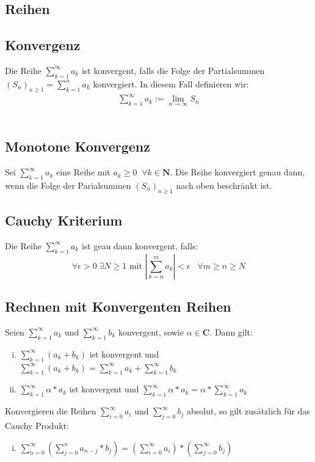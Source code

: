 \documentclass[8pt]{extarticle}
\begin{document}
\begin{multicols*}{3}
\newpage
\section{Reihen}
\hypertarget{sec:1}{}
  \subsection{Konvergenz}
Die Reihe $\sum_{k = 1}^{\infty} a_k$ ist konvergent, falls die Folge der
Partialsummen $(S_n)_{n \geq 1} = \sum_{k = 1}^{n} a_k$
konvergiert. In diesem Fall definieren wir:
\begin{align*}
  \sum_{k = 1}^{\infty} a_k := \lim_{n \rightarrow \infty} S_n
\end{align*}\\
  \subsection {Monotone Konvergenz}
Sei $\sum_{k = 1}^\infty a_k$ eine Reihe mit $a_k \geq 0 \;\; \forall k \in \mathbf{N}$.
Die Reihe konvergiert genau dann, wenn die Folge der Parialsummen $(S_n)_{n \geq 1}$ nach
oben beschränkt ist.
\subsection{Cauchy Kriterium}
Die Reihe $\sum_{k = 1}^{\infty} a_k$ ist geau dann konvergent, falls:
$$
  \forall \epsilon > 0 \; \exists N \geq 1 \text{ mit } \left| \sum_{k = n}^m a_k \right| < \epsilon \; \; \; \forall m \geq n \geq N
$$
\subsection{Rechnen mit Konvergenten Reihen}
Seien $\sum_{k = 1}^\infty a_k$ und $\sum_{k = 1}^\infty b_k$ konvergent, sowie $\alpha \in \mathbf{C}$.
Dann gilt:
\begin{enumerate}[(i)]
  \item $\sum_{k = 1}^\infty (a_k + b_k)$ ist konvergent und $\sum_{k = 1}^\infty (a_k + b_k) = \sum_{k = 1}^\infty a_k + \sum_{k = 1}^\infty b_k$
  \item $\sum_{k = 1}^\infty \alpha * a_k$ ist konvergent und $\sum_{k = 1}^\infty \alpha * a_k = \alpha * \sum_{k = 1}^\infty a_k$
\end{enumerate}
Konvergieren die Reihen $\sum_{i = 0}^\infty a_i$ und $\sum_{j = 0}^\infty b_j$ absolut,
so gilt zusätzlich für das Cauchy Produkt:
\begin{enumerate}[(iii)]
  \item $\sum_{n = 0}^\infty (\sum_{j = 0}^n a_{n - j} * b_j) = (\sum_{i = 0}^\infty a_i) * (\sum_{j = 0}^\infty b_j)$
\end{enumerate}

\end{multicols*}
\end{document}
